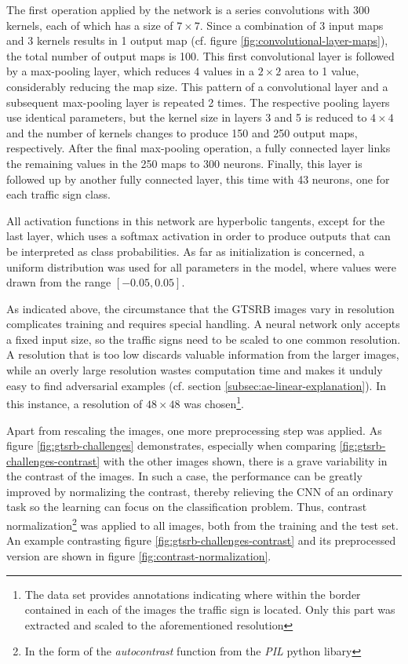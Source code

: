\documentclass[11pt, a4paper]{article}
\newcommand\brackets[1]{\left[#1\right]}
\begin{document}
The first operation applied by the network is a series convolutions with 300 kernels, each of which has a size of $7 \times 7$. Since a combination of 3 input maps and 3 kernels results in 1 output map (cf. figure \ref{fig:convolutional-layer-maps}), the total number of output maps is 100. This first convolutional layer is followed by a max-pooling layer, which reduces 4 values in a $2 \times 2$ area to 1 value, considerably reducing the map size. This pattern of a convolutional layer and a subsequent max-pooling layer is repeated 2 times. The respective pooling layers use identical parameters, but the kernel size in layers 3 and 5 is reduced to $ 4 \times 4$ and the number of kernels changes to produce 150 and 250 output maps, respectively. After the final max-pooling operation, a fully connected layer links the remaining values in the 250 maps to 300 neurons. Finally, this layer is followed up by another fully connected layer, this time with 43 neurons, one for each traffic sign class.

All activation functions in this network are hyperbolic tangents, except for the last layer, which uses a softmax activation in order to produce outputs that can be interpreted as class probabilities. As far as initialization is concerned, a uniform distribution was used for all parameters in the model, where values were drawn from the range $\brackets{-0.05, 0.05}$.

As indicated above, the circumstance that the GTSRB images vary in resolution complicates training and requires special handling. A neural network only accepts a fixed input size, so the traffic signs need to be scaled to one common resolution. A resolution that is too low discards valuable information from the larger images, while an overly large resolution wastes computation time and makes it unduly easy to find adversarial examples (cf. section \ref{subsec:ae-linear-explanation}). In this instance, a resolution of $48 \times 48$ was chosen\footnote{The data set provides annotations indicating where within the border contained in each of the images the traffic sign is located. Only this part was extracted and scaled to the aforementioned resolution}.

Apart from rescaling the images, one more preprocessing step was applied. As figure \ref{fig:gtsrb-challenges} demonstrates, especially when comparing \ref{fig:gtsrb-challenges-contrast} with the other images shown, there is a grave variability in the contrast of the images. In such a case, the performance can be greatly improved by normalizing the contrast, thereby relieving the CNN of an ordinary task so the learning can focus on the classification problem. Thus, contrast normalization\footnote{In the form of the \emph{autocontrast} function from the \emph{PIL} python libary} was applied to all images, both from the training and the test set. An example contrasting figure \ref{fig:gtsrb-challenges-contrast} and its preprocessed version are shown in figure \ref{fig:contrast-normalization}.
\end{document}
